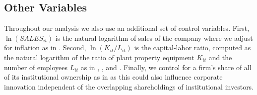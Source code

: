 \documentclass[12pt]{article}
\begin{document}


\subsection{Other Variables}

Throughout our analysis we also use an additional set of control variables. First, $\ln(\mathit{SALES}_{it})$ is the natural logarithm of sales of the company where we adjust for inflation as in \citet{brav2014shareholder}. Second, $\ln(K_{it}/L_{it})$ is the capital-labor ratio, computed as the natural logarithm of the ratio of plant property equipment $K_{it}$ and the number of employees $L_{it}$ as in \cite{aghion2013innovation}, \cite{hall2001nber}, and \cite{gompers2001institutional}. Finally, we control for a firm's share of all of its institutional ownership as in \citet{aghion2013innovation} as this could also influence corporate innovation independent of the overlapping shareholdings of institutional investors.
\end{document}
